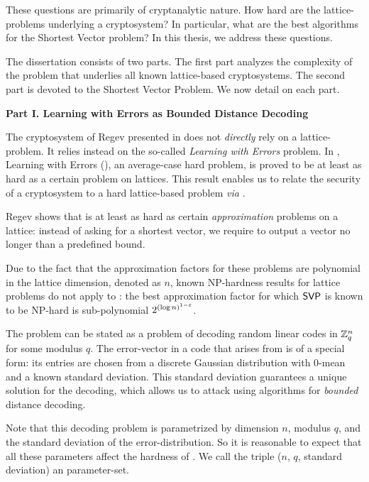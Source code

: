 These questions are primarily of cryptanalytic nature. How hard are the lattice-problems underlying a cryptosystem? In particular, what are the best algorithms for the Shortest Vector problem? In this thesis, we address these questions.

The dissertation consists of two parts. The first part analyzes the complexity of the problem that underlies all known lattice-based cryptosystems. The second part is devoted to the Shortest Vector Problem. We now detail on each part.
\vspace{7pt}
\begin{center}
	\textbf{Part I. Learning with Errors as Bounded Distance Decoding}
\end{center} 
The cryptosystem of Regev presented in \cite{STOC:Regev05} does not \emph{directly} rely on a lattice-problem. It relies instead on the so-called \emph{Learning with Errors} problem. In \cite{STOC:Regev05}, Learning with Errors (\LWE), an average-case hard problem, is proved to be at least as hard as a certain problem on lattices. This result enables us to relate the security of a cryptosystem to a hard lattice-based problem \emph{via} \LWE.   
  
Regev shows that \LWE is at least as hard as certain \emph{approximation} problems on a lattice: instead of asking for a shortest vector, we require to output a vector no longer than a predefined bound.
	
Due to the fact that the approximation factors for these problems are polynomial in the lattice dimension, denoted as $n$, known NP-hardness results for lattice problems \cite{FOCS:Khot03, FOCS:Micciancio98, STOC:HavReg07} do not apply to \LWE: the best approximation factor for which $\textsf{SVP}$ is known to be NP-hard is sub-polynomial $2^{(\log n)^{1-\varepsilon}}$. 

The \LWE problem can be stated as a problem of decoding random linear codes in ${{\mathbb Z}}_q^n$ for some modulus $q$. The error-vector in a code that arises from \LWE is of a special form: its entries are chosen from a discrete Gaussian distribution with 0-mean and a known standard deviation. This standard deviation guarantees a unique solution for the decoding, which allows us to attack \LWE using algorithms for \emph{bounded} distance decoding.

Note that this decoding problem is parametrized by dimension $n$, modulus $q$, and the standard deviation of the error-distribution. So it is reasonable to expect that all these parameters affect the hardness of \LWE. We call the triple ($n$, $q$, standard deviation) an \LWE parameter-set. 

